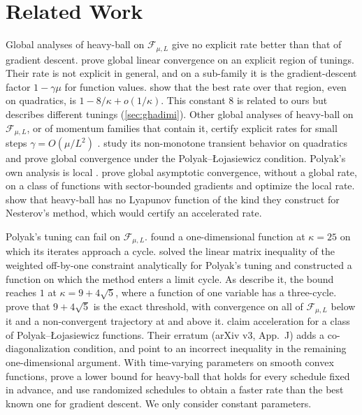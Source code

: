 \documentclass[11pt, a4paper]{article}
\theoremstyle{definition}
\newcommand{\F}{\mathcal{F}_{\mu,L}}
\begin{document}
\section{Related Work}
\label{sec:related}

Global analyses of heavy-ball on $\F$ give no explicit rate better than that of gradient descent.
 prove global linear convergence on an explicit region of tunings. Their rate is not explicit
in general, and on a sub-family it is the gradient-descent factor $1-\gamma\mu$ for function values. 
show that the best rate over that region, even on quadratics, is $1-8/\kappa+o(1/\kappa)$. This constant $8$ is related
to ours but describes different tunings (\cref{sec:ghadimi}). Other global analyses of heavy-ball on $\F$, or of
momentum families that contain it, certify explicit rates for small steps $\gamma=O(\mu/L^2)$
\citep{shi2022understanding,can2022entropic}.  study its non-monotone transient behavior on
quadratics and prove global convergence under the Polyak--{\L}ojasiewicz condition.
Polyak's own analysis is local \citep{polyak1964some}.  prove global asymptotic
convergence, without a global rate, on a class of functions with sector-bounded gradients and optimize the local rate.
 show that heavy-ball has no Lyapunov function of the kind they construct for
Nesterov's method, which would certify an accelerated rate.

Polyak's tuning can fail on $\F$.  found a one-dimensional function at $\kappa=25$ on
which its iterates approach a cycle.  solved the linear matrix inequality of the weighted
off-by-one constraint analytically for Polyak's tuning and constructed a function on which the method enters a limit
cycle. As \citet[§1.1]{pasechniuk2026two} describe it, the bound reaches $1$ at $\kappa=9+4\sqrt5$, where a function of
one variable has a three-cycle. 
prove that $9+4\sqrt5$ is the exact threshold, with convergence on all of $\F$ below it and a non-convergent trajectory
at and above it.  claim acceleration for a class of
Polyak--{\L}ojasiewicz functions. Their erratum (arXiv v3, App.~J) adds a co-diagonalization condition, and
\citet{goujaud2025riddles} point to an incorrect inequality in the remaining one-dimensional argument. With time-varying
parameters on smooth convex functions, \citet{ma2026lower} prove a lower bound for heavy-ball that holds for every
schedule fixed in advance, and \citet{he2026heavy} use randomized schedules to obtain a faster rate than the best known
one for gradient descent. We only consider constant
parameters.
\end{document}
